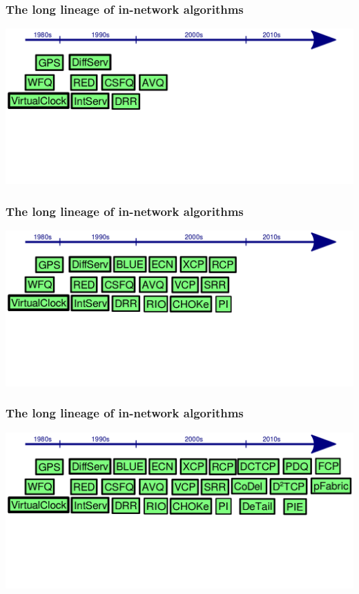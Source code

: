 \begin{frame}[plain]
\frametitle{The long lineage of in-network algorithms}
\begin{center}
\noindent \hspace{-.75 cm} \includegraphics[width=.9\textwidth]{march-2.png}
\end{center}
\end{frame}

\begin{frame}[plain]
\frametitle{The long lineage of in-network algorithms}
\begin{center}
\noindent \hspace{-.75 cm} \includegraphics[width=.9\textwidth]{march-1.png}
\end{center}
\end{frame}

\begin{frame}[plain]
\frametitle{The long lineage of in-network algorithms}
\begin{center}
\noindent \hspace{-.75 cm} \includegraphics[width=.9\textwidth]{march.png}
\end{center}
\end{frame}

